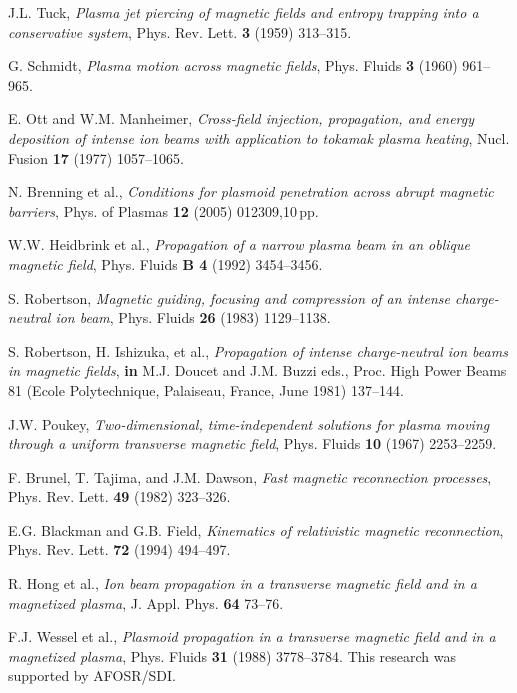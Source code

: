 \documentclass [12pt,a4paper,     ]{report} %
\begin{document}
\begin{enumerate}
 J.L. Tuck, \emph{Plasma jet piercing of magnetic fields and entropy trapping into a conservative system}, Phys. Rev. Lett. {\bf 3} (1959) 313--315.

 G. Schmidt, \emph{Plasma motion across magnetic fields}, Phys. Fluids {\bf 3} (1960) 961--965.

 E. Ott and W.M. Manheimer, \emph{Cross-field injection, propagation, and energy deposition of intense ion beams with application to tokamak plasma heating}, Nucl. Fusion {\bf 17} (1977) 1057--1065.

 N. Brenning et al., \emph{Conditions for plasmoid penetration across abrupt magnetic barriers}, Phys. of Plasmas {\bf 12} (2005) 012309,10\,pp.

 W.W. Heidbrink et al., \emph{Propagation of a narrow plasma beam in an oblique magnetic field}, Phys. Fluids {\bf B 4} (1992) 3454--3456.

 S. Robertson, \emph{Magnetic guiding, focusing and compression of an intense charge-neutral ion beam}, Phys. Fluids {\bf 26} (1983) 1129--1138.

 S. Robertson, H. Ishizuka, et al., \emph{Propagation of intense charge-neutral ion beams in magnetic fields}, {\bf in} M.J. Doucet and J.M. Buzzi eds., Proc. High Power Beams 81  (Ecole Polytechnique, Palaiseau, France, June 1981) 137--144.

 J.W. Poukey, \emph{Two-dimensional, time-independent solutions for plasma moving through a uniform transverse magnetic field}, Phys. Fluids {\bf 10} (1967) 2253--2259.

 F. Brunel, T. Tajima, and J.M. Dawson, \emph{Fast magnetic reconnection processes}, Phys. Rev. Lett. {\bf 49} (1982) 323--326.

 E.G. Blackman and G.B. Field, \emph{Kinematics of relativistic magnetic reconnection},  Phys. Rev. Lett. {\bf 72} (1994) 494--497.

 R. Hong et al., \emph{Ion beam propagation in a transverse magnetic field and in a magnetized plasma}, J. Appl. Phys. {\bf 64} 73--76.

 F.J. Wessel et al., \emph{Plasmoid propagation in a transverse magnetic field and in a magnetized plasma}, Phys. Fluids {\bf 31} (1988) 3778--3784. This research was supported by AFOSR/SDI.


\end{enumerate}
\end{document}
